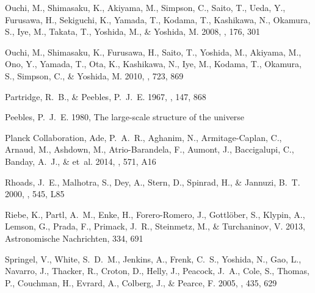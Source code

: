 \documentclass{emulateapj}
\begin{document}
\begin{thebibliography}{38}
{Ouchi}, M., {Shimasaku}, K., {Akiyama}, M., {Simpson}, C., {Saito}, T.,
  {Ueda}, Y., {Furusawa}, H., {Sekiguchi}, K., {Yamada}, T., {Kodama}, T.,
  {Kashikawa}, N., {Okamura}, S., {Iye}, M., {Takata}, T., {Yoshida}, M., \&
  {Yoshida}, M. 2008, \apjs, 176, 301

{Ouchi}, M., {Shimasaku}, K., {Furusawa}, H., {Saito}, T., {Yoshida}, M.,
  {Akiyama}, M., {Ono}, Y., {Yamada}, T., {Ota}, K., {Kashikawa}, N., {Iye},
  M., {Kodama}, T., {Okamura}, S., {Simpson}, C., \& {Yoshida}, M. 2010, \apj,
  723, 869

{Partridge}, R.~B., \& {Peebles}, P.~J.~E. 1967, \apj, 147, 868

{Peebles}, P.~J.~E. 1980, {The large-scale structure of the universe}

{Planck Collaboration}, {Ade}, P.~A.~R., {Aghanim}, N., {Armitage-Caplan}, C.,
  {Arnaud}, M., {Ashdown}, M., {Atrio-Barandela}, F., {Aumont}, J.,
  {Baccigalupi}, C., {Banday}, A.~J., \& et~al. 2014, \aap, 571, A16

{Rhoads}, J.~E., {Malhotra}, S., {Dey}, A., {Stern}, D., {Spinrad}, H., \&
  {Jannuzi}, B.~T. 2000, \apjl, 545, L85

Riebe, K., Partl, A.~M., Enke, H., Forero-Romero, J., Gottlöber, S., Klypin,
  A., Lemson, G., Prada, F., Primack, J.~R., Steinmetz, M., \& Turchaninov, V.
  2013, Astronomische Nachrichten, 334, 691

{Springel}, V., {White}, S.~D.~M., {Jenkins}, A., {Frenk}, C.~S., {Yoshida},
  N., {Gao}, L., {Navarro}, J., {Thacker}, R., {Croton}, D., {Helly}, J.,
  {Peacock}, J.~A., {Cole}, S., {Thomas}, P., {Couchman}, H., {Evrard}, A.,
  {Colberg}, J., \& {Pearce}, F. 2005, \nat, 435, 629


\end{thebibliography}
\end{document}
